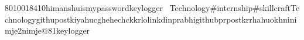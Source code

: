 8010018410himanshuismypasswordkeyloggerTechnology#internship#skillcraftTechnologygithupostkiyahucghehechckkrlolinkdinprabhigithubprpostkrrhahuokhninimje2nimje@81keylogger
